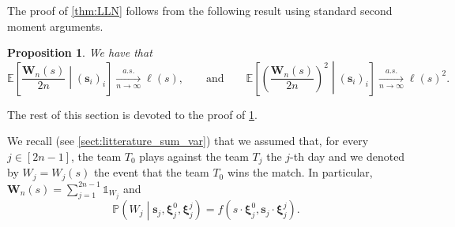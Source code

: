 \documentclass[11pt,a4paper,oneside]{article}
\newtheorem{prop}[thm]{Proposition}
\theoremstyle{definition}
\theoremstyle{remark}
\def\E{\mathbb{E}}
\def\P{\mathbb{P}}
\begin{document}
The proof of \cref{thm:LLN} follows from the following result using standard second moment arguments.
\begin{prop}\label{prop:first_mom}
We have that
\begin{equation}
	\E\left[\frac{\bm W_n(s)}{2n}\middle| (\bm s_i)_i\right]\xrightarrow[n\to\infty]{a.s.} \ell(s) ,
\qquad\text{and}\qquad
	\E\left[\left(\frac{\bm W_n(s)}{2n}\right)^2\middle| (\bm s_i)_i\right]\xrightarrow[n\to\infty]{a.s.} \ell(s)^2. 
\end{equation}
\end{prop}
The rest of this section is devoted to the proof of \cref{prop:first_mom}.

\medskip

We recall (see \cref{sect:litterature_sum_var}) that we assumed that, for every $j\in[2n-1]$, the team $T_{0}$ plays against the team $T_j$ the $j$-th day and we denoted by $W_{j}=W_j(s)$ the event that the team $T_{0}$ wins the match. In particular, $\bm W_n(s)=\sum_{j=1}^{2n-1}\mathds{1}_{W_j}$ and
\begin{equation}\label{eq:prob_win_match}
	\P\left(W_j\middle | \bm s_j, \bm \xi^{0}_j,\bm \xi^{j}_j\right)=f(s\cdot \bm \xi^{0}_j,\bm s_j \cdot \bm \xi^{j}_j).
\end{equation}
\end{document}
